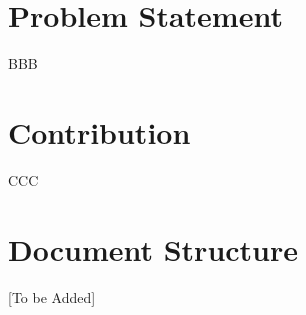 \section{Problem Statement}

BBB

\section{Contribution}

CCC


\section{Document Structure}

[To be Added]


